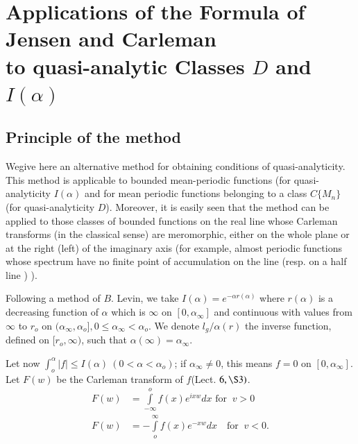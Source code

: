 \chapter[Applications of the Formula of Jensen and...]{Applications of the Formula of Jensen and
 Carleman \\ to quasi-analytic Classes $D$ and $I (\alpha)$}\label{chap21}%

\section{Principle of the method}\label{chap21:sec1}%

We\pageoriginale give here an alternative method for obtaining conditions of
quasi-analyticity. This method is applicable to bounded mean-periodic
functions (for quasi-analyticity $I(\alpha)$ and for mean periodic
functions belonging to a class $C\{M_n\}$ (for quasi-analyticity
$D$). Moreover, it is easily seen that the method can be applied to
those classes of bounded functions on the real line whose Carleman
transforms (in the classical sense) are meromorphic, either on the
whole plane or at the right (left) of the imaginary axis (for example,
almost periodic functions whose spectrum have no finite point of
accumulation on the line (resp. on a half line ) ). 

Following a method of $B$. Levin, we take $I (\alpha) = e^{- \alpha r
 (\alpha)} $ where $r (\alpha)$ is a decreasing function of $\alpha$
which is $\infty$ on $[0, \alpha_\infty]$ and continuous with values
from $\infty$ to $r_o$ on $(\alpha_\infty, \alpha_o ], 0 \le
 \alpha_\infty < \alpha_o$. We denote $l_g/\alpha (r)$ the inverse
 function, defined on $[ r_o, \infty)$, such that $\alpha (\infty) =
 \alpha_\infty$. 

Let now $\int^\alpha_o | f | \le I (\alpha) ~ (0 < \alpha < \alpha_o)
$; if $\alpha_\infty \neq 0$, this means $f = 0$ on $[0,
 \alpha_\infty]$. Let $F(w)$ be the Carleman transform of $f
$(Lect. $6, \S 3)$. 
\begin{align*}
 F(w) & = \int\limits^o_{- \infty} f(x) e^{ixw} dx \text { for } ~ v > 0\\
 F(w) & = - \int\limits^{\infty}_o f(x) e^{-xw } dx \quad \text {for } ~ v < 0.
\end{align*}


